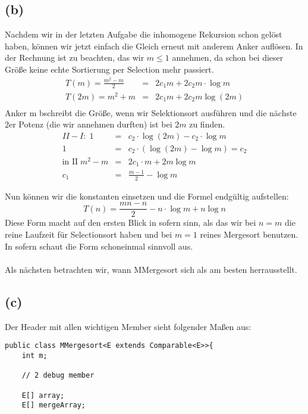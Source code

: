 \documentclass[11pt,a4paper,ngerman]{article}
\begin{document}
\subsection*{(b)}

Nachdem wir in der letzten Aufgabe die inhomogene Rekursion schon gelöst haben, können wir jetzt einfach die Gleich erneut mit anderem Anker auflösen.
In der Rechnung ist zu beachten, das wir $m \leq 1$ annehmen, da schon bei dieser Größe keine echte Sortierung per Selection mehr passiert.
$$
\begin{array}{rcl}
T(m)= \frac{m^2 - m}{2} &=&  2 c_1 m + 2 c_2 m \cdot \log m\\
T(2m) = m^2 + m &=& 2c_1 m + 2c_2 m \log (2m)\\
\end{array}
$$
Anker m bschreibt die Größe, wenn wir Selektionsort ausführen und die nächste 2er Potenz (die wir annehmen durften) ist bei $2m$ zu finden.
$$
\begin{array}{rcl}
II - I:\;1 &=& c_2 \cdot \log(2m) - c_2 \cdot \log m\\
1 &=& c_2 \cdot \left( \log (2m) - \log m\right)= c_2\\
\text{in II}\; m^2 - m &=& 2c_1 \cdot m + 2m\log m\\
c_1 &=& \frac{m-1}{2} - \log m
\end{array}
$$

Nun können wir die konstanten einsetzen und die Formel endgültig aufstellen:
$$
T(n) = \frac{mn - n}{2} - n \cdot \log m + n \log n
$$
Diese Form macht auf den ersten Blick in sofern sinn, als das wir bei $n = m$ die reine Laufzeit für Selectionsort haben und bei $m=1$ reines Mergesort benutzen. In sofern schaut die Form schoneinmal sinnvoll aus.\\
\vspace{\baselineskip}\\

Als nächsten betrachten wir, wann MMergesort sich als am besten herrausstellt.

\subsection*{(c)}

Der Header mit allen wichtigen Member sieht folgender Maßen aus:
\begin{lstlisting}
public class MMergesort<E extends Comparable<E>>{
	int m;

	// 2 debug member	

	E[] array;
	E[] mergeArray;
\end{lstlisting}
\end{document}
